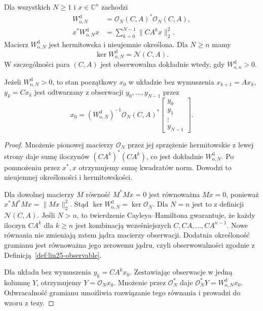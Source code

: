 \begin{twierdzenie}
\label{thm:lin27-discrete-gramian}
Dla wszystkich \(N\ge1\)
i \(x\in\mathbb C^n\) zachodzi
\[
 \begin{aligned}
 W_{\mathrm o,N}^{\mathrm d}
   &=\mathcal O_N(C,A)^*
      \mathcal O_N(C,A),\\
 x^*W_{\mathrm o,N}^{\mathrm d}x
   &=\sum_{k=0}^{N-1}\|CA^kx\|_2^2.
 \end{aligned}
\]
Macierz
\(W_{\mathrm o,N}^{\mathrm d}\)
jest hermitowska
i nieujemnie określona.
Dla \(N\ge n\) mamy
\[
 \ker W_{\mathrm o,N}^{\mathrm d}
 =\mathcal N(C,A).
\]
W szczególności para \((C,A)\)
jest obserwowalna dokładnie wtedy,
gdy \(W_{\mathrm o,n}^{\mathrm d}>0\).

Jeżeli \(W_{\mathrm o,N}^{\mathrm d}>0\),
to stan początkowy \(x_0\)
w układzie bez wymuszenia
\(x_{k+1}=Ax_k\), \(y_k=Cx_k\)
jest odtwarzany z obserwacji
\(y_0,\ldots,y_{N-1}\) przez
\[
 x_0=
 (W_{\mathrm o,N}^{\mathrm d})^{-1}
 \mathcal O_N(C,A)^*
 \begin{bmatrix}
  y_0\\y_1\\\vdots\\y_{N-1}
 \end{bmatrix}.
\]
\end{twierdzenie}
\begin{proof}
Mnożenie pionowej macierzy
\(\mathcal O_N\) przez jej sprzężenie
hermitowskie z lewej strony daje
sumę iloczynów
\((CA^k)^*(CA^k)\),
co jest dokładnie
\(W_{\mathrm o,N}^{\mathrm d}\).
Po pomnożeniu przez \(x^*,x\)
otrzymujemy sumę kwadratów norm.
Dowodzi to nieujemnej określoności
i hermitowskości.

Dla dowolnej macierzy \(M\)
równość \(M^*Mx=0\)
jest równoważna \(Mx=0\),
ponieważ
\(x^*M^*Mx=\|Mx\|_2^2\).
Stąd
\(\ker W_{\mathrm o,N}^{\mathrm d}
 =\ker\mathcal O_N\).
Dla \(N=n\) jest to z definicji
\(\mathcal N(C,A)\).
Jeśli \(N>n\), to
twierdzenie Cayleya--Hamiltona
gwarantuje, że każdy iloczyn
\(CA^k\) dla \(k\ge n\)
jest kombinacją wcześniejszych
\(C,CA,\ldots,CA^{n-1}\).
Nowe równania nie zmieniają
zatem jądra macierzy obserwacji.
Dodatnia określoność
gramianu jest równoważna
jego zerowemu jądru,
czyli obserwowalności
zgodnie z
Definicją~\ref{def:lin25-observable}.

Dla układu bez wymuszenia
\(y_k=CA^kx_0\).
Zestawiając obserwacje
w jedną kolumnę \(Y\),
otrzymujemy
\(Y=\mathcal O_Nx_0\).
Mnożenie przez
\(\mathcal O_N^*\) daje
\(\mathcal O_N^*Y
 =W_{\mathrm o,N}^{\mathrm d}x_0\).
Odwracalność gramianu
umożliwia rozwiązanie
tego równania i prowadzi
do wzoru z tezy.
\end{proof}

